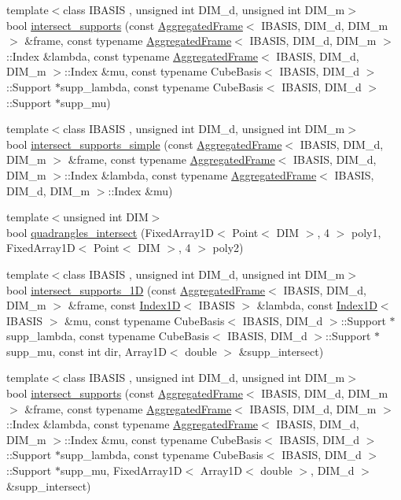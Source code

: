 \begin{CompactItemize}
\item 
{\footnotesize template$<$class IBASIS , unsigned int DIM\_\-d, unsigned int DIM\_\-m$>$ }\\bool \hyperlink{namespaceFrameTL_6d6670ec9613c9cf6ac3511a4b623429}{intersect\_\-supports} (const \hyperlink{classFrameTL_1_1AggregatedFrame}{AggregatedFrame}$<$ IBASIS, DIM\_\-d, DIM\_\-m $>$ \&frame, const typename \hyperlink{classFrameTL_1_1AggregatedFrame}{AggregatedFrame}$<$ IBASIS, DIM\_\-d, DIM\_\-m $>$::Index \&lambda, const typename \hyperlink{classFrameTL_1_1AggregatedFrame}{AggregatedFrame}$<$ IBASIS, DIM\_\-d, DIM\_\-m $>$::Index \&mu, const typename CubeBasis$<$ IBASIS, DIM\_\-d $>$::Support $\ast$supp\_\-lambda, const typename CubeBasis$<$ IBASIS, DIM\_\-d $>$::Support $\ast$supp\_\-mu)
\item 
{\footnotesize template$<$class IBASIS , unsigned int DIM\_\-d, unsigned int DIM\_\-m$>$ }\\bool \hyperlink{namespaceFrameTL_8008f4b3d0a7bb7acab2b74a29d60222}{intersect\_\-supports\_\-simple} (const \hyperlink{classFrameTL_1_1AggregatedFrame}{AggregatedFrame}$<$ IBASIS, DIM\_\-d, DIM\_\-m $>$ \&frame, const typename \hyperlink{classFrameTL_1_1AggregatedFrame}{AggregatedFrame}$<$ IBASIS, DIM\_\-d, DIM\_\-m $>$::Index \&lambda, const typename \hyperlink{classFrameTL_1_1AggregatedFrame}{AggregatedFrame}$<$ IBASIS, DIM\_\-d, DIM\_\-m $>$::Index \&mu)
\item 
{\footnotesize template$<$unsigned int DIM$>$ }\\bool \hyperlink{namespaceFrameTL_0f4762cff5b194a929e2eadddbfd0d71}{quadrangles\_\-intersect} (FixedArray1D$<$ Point$<$ DIM $>$, 4 $>$ poly1, FixedArray1D$<$ Point$<$ DIM $>$, 4 $>$ poly2)
\item 
{\footnotesize template$<$class IBASIS , unsigned int DIM\_\-d, unsigned int DIM\_\-m$>$ }\\bool \hyperlink{namespaceFrameTL_02c30f3ec04242a2445af8e588bae6b2}{intersect\_\-supports\_\-1D} (const \hyperlink{classFrameTL_1_1AggregatedFrame}{AggregatedFrame}$<$ IBASIS, DIM\_\-d, DIM\_\-m $>$ \&frame, const \hyperlink{classFrameTL_1_1Index1D}{Index1D}$<$ IBASIS $>$ \&lambda, const \hyperlink{classFrameTL_1_1Index1D}{Index1D}$<$ IBASIS $>$ \&mu, const typename CubeBasis$<$ IBASIS, DIM\_\-d $>$::Support $\ast$supp\_\-lambda, const typename CubeBasis$<$ IBASIS, DIM\_\-d $>$::Support $\ast$supp\_\-mu, const int dir, Array1D$<$ double $>$ \&supp\_\-intersect)
\item 
{\footnotesize template$<$class IBASIS , unsigned int DIM\_\-d, unsigned int DIM\_\-m$>$ }\\bool \hyperlink{namespaceFrameTL_5aeecded043a910b0dae7228883304b3}{intersect\_\-supports} (const \hyperlink{classFrameTL_1_1AggregatedFrame}{AggregatedFrame}$<$ IBASIS, DIM\_\-d, DIM\_\-m $>$ \&frame, const typename \hyperlink{classFrameTL_1_1AggregatedFrame}{AggregatedFrame}$<$ IBASIS, DIM\_\-d, DIM\_\-m $>$::Index \&lambda, const typename \hyperlink{classFrameTL_1_1AggregatedFrame}{AggregatedFrame}$<$ IBASIS, DIM\_\-d, DIM\_\-m $>$::Index \&mu, const typename CubeBasis$<$ IBASIS, DIM\_\-d $>$::Support $\ast$supp\_\-lambda, const typename CubeBasis$<$ IBASIS, DIM\_\-d $>$::Support $\ast$supp\_\-mu, FixedArray1D$<$ Array1D$<$ double $>$, DIM\_\-d $>$ \&supp\_\-intersect)

\end{CompactItemize}
